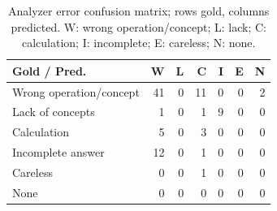 \begin{table}[htbp]\centering\small
\caption{Analyzer error confusion matrix; rows gold, columns predicted. W: wrong operation/concept; L: lack; C: calculation; I: incomplete; E: careless; N: none.}\label{tab:analyzerconfusion}
\begin{tabular}{@{}lrrrrrr@{}}\toprule
Gold / Pred. & W & L & C & I & E & N\\\midrule
Wrong operation/concept & 41 & 0 & 11 & 0 & 0 & 2\\
Lack of concepts & 1 & 0 & 1 & 9 & 0 & 0\\
Calculation & 5 & 0 & 3 & 0 & 0 & 0\\
Incomplete answer & 12 & 0 & 1 & 0 & 0 & 0\\
Careless & 0 & 0 & 1 & 0 & 0 & 0\\
None & 0 & 0 & 0 & 0 & 0 & 0\\
\bottomrule\end{tabular}\end{table}
